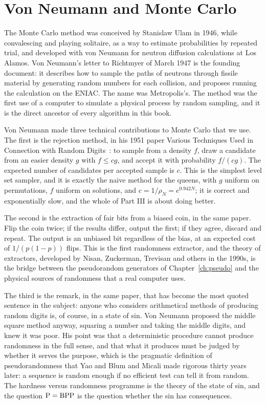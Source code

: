 \section{Von Neumann and Monte Carlo}

The Monte Carlo method was conceived by Stanislaw Ulam in 1946, while convalescing and playing solitaire, as a way to estimate probabilities by repeated trial, and developed with von Neumann for neutron diffusion calculations at Los Alamos. Von Neumann's letter to Richtmyer of March 1947 is the founding document: it describes how to sample the paths of neutrons through fissile material by generating random numbers for each collision, and proposes running the calculation on the ENIAC. The name was Metropolis's. The method was the first use of a computer to simulate a physical process by random sampling, and it is the direct ancestor of every algorithm in this book.

Von Neumann made three technical contributions to Monte Carlo that we use. The first is the rejection method, in his 1951 paper Various Techniques Used in Connection with Random Digits~\cite{vonNeumann51}: to sample from a density $f$, draw a candidate from an easier density $g$ with $f \le c g$, and accept it with probability $f / (c g)$. The expected number of candidates per accepted sample is $c$. This is the simplest level set sampler, and it is exactly the naive method for the queens, with $g$ uniform on permutations, $f$ uniform on solutions, and $c = 1/\rho_N = e^{0.942 N}$; it is correct and exponentially slow, and the whole of Part III is about doing better.

The second is the extraction of fair bits from a biased coin, in the same paper. Flip the coin twice; if the results differ, output the first; if they agree, discard and repeat. The output is an unbiased bit regardless of the bias, at an expected cost of $1 / (p(1-p))$ flips. This is the first randomness extractor, and the theory of extractors, developed by Nisan, Zuckerman, Trevisan and others in the 1990s, is the bridge between the pseudorandom generators of Chapter~\ref{ch:pseudo} and the physical sources of randomness that a real computer uses.

The third is the remark, in the same paper, that has become the most quoted sentence in the subject: anyone who considers arithmetical methods of producing random digits is, of course, in a state of sin. Von Neumann proposed the middle square method anyway, squaring a number and taking the middle digits, and knew it was poor. His point was that a deterministic procedure cannot produce randomness in the full sense, and that what it produces must be judged by whether it serves the purpose, which is the pragmatic definition of pseudorandomness that Yao and Blum and Micali made rigorous thirty years later: a sequence is random enough if no efficient test can tell it from random. The hardness versus randomness programme is the theory of the state of sin, and the question $\mathrm{P} = \mathrm{BPP}$ is the question whether the sin has consequences.

